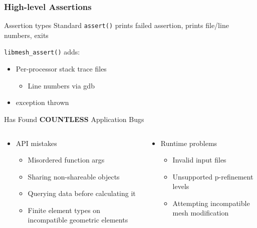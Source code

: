 \begin{frame}
\frametitle{High-level Assertions}

\begin{block}{Assertion types}
Standard \texttt{assert()} prints failed assertion, prints file/line numbers, exits

\texttt{libmesh\_assert()} adds:
\begin{itemize}
\item Per-processor stack trace files
\begin{itemize}
\item Line numbers via gdb
\end{itemize}
\item \cpp{} exception thrown
\end{itemize}
\end{block}

\pause

\begin{block}{Has Found {\bf COUNTLESS} Application Bugs}
\begin{columns}[t]
\begin{column}{.5\textwidth}
\begin{itemize}
\item API mistakes
\begin{itemize}
\item {\small Misordered function args}
\item {\footnotesize Sharing non-shareable objects}
\item {\scriptsize Querying data before calculating it}
\item {\tiny Finite element types on incompatible geometric elements}
\end{itemize}
\end{itemize}
\end{column}
\begin{column}{.5\textwidth}
\begin{itemize}
\item Runtime problems
\begin{itemize}
\item {\small Invalid input files}
\item {\footnotesize Unsupported p-refinement levels}
\item {\scriptsize Attempting incompatible mesh modification}
\end{itemize}
\end{itemize}
\end{column}
\end{columns}
\end{block}
\end{frame}

